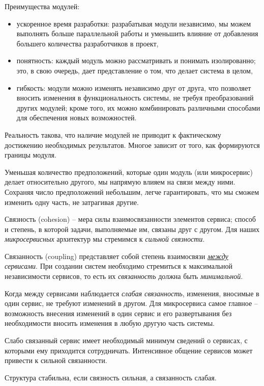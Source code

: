 \documentclass[%
	11pt,
	a4paper,
	utf8,
		]{article}
\begin{document}
Преимущества модулей:
\begin{itemize}
	\item ускоренное время разработки: разрабатывая модули независимо, мы можем выполнять больше параллельной работы и уменьшить влияние от добавления большего количества разработчиков в проект,
	
	\item понятность: каждый модуль можно рассматривать и понимать изолированно; это, в свою очередь, дает представление о том, что делает система в целом,
	
	\item гибкость: модули можно изменять независимо друг от друга, что позволяет вносить изменения в функциональность системы, не требуя преобразований других модулей; кроме того, их можно комбинировать различными способами для обеспечения новых возможностей.
\end{itemize}

Реальность такова, что наличие модулей не приводит к фактическому достижению необходимых результатов. Многое зависит от того, как формируются границы модуля.

Уменьшая количество предположений, которые один модуль (или микросервис) делает относительно другого, мы напрямую влияем на связи между ними. Сохраняя число предположений небольшим, легче гарантировать, что мы сможем изменить одну часть, не затрагивая другие.

Связность (cohesion) -- мера силы взаимосвязанности элементов сервиса; способ и степень, в которой задачи, выполняемые им, связаны друг с другом. Для наших \emph{микросервисных} архитектур мы стремимся к \emph{сильной связности}.

Связанность (coupling) представляет собой степень взаимосвязи \emph{\underline{между} сервисами}. При создании систем необходимо стремиться к максимальной независимости сервисов, то есть их \emph{связанность} должна быть \emph{минимальной}.

Когда между сервисами наблюдается \emph{слабая связанность}, изменения, вносимые в один сервис, не требуют изменений в другом. Для микросервиса самое главное -- возможность внесения изменений в один сервис и его развертывания без необходимости вносить изменения в любую другую часть системы.

Слабо связанный сервис имеет необходимый минимум сведений о сервисах, с которыми ему приходится сотрудничать. Интенсивное общение сервисов может привести к сильной связанности.

Структура стабильна, если связность сильная, а связанность слабая.
\end{document}
